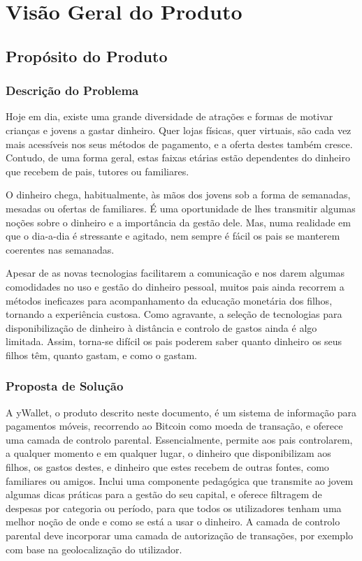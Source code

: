 \documentclass[12pt,a4paper]{article}
\begin{document}


\tableofcontents
\newpage
\section{Visão Geral do Produto}
  \subsection{Propósito do Produto}
    \subsubsection{Descrição do Problema}

      Hoje em dia, existe uma grande diversidade de atrações e formas de motivar crianças e jovens a gastar dinheiro. Quer lojas físicas, quer virtuais, são cada vez mais acessíveis nos seus métodos de pagamento, e a oferta destes também cresce. Contudo, de uma forma geral, estas faixas etárias estão dependentes do dinheiro que recebem de pais, tutores ou familiares.

      O dinheiro chega, habitualmente, às mãos dos jovens sob a forma de semanadas, mesadas ou ofertas de familiares. É uma oportunidade de lhes transmitir algumas noções sobre o dinheiro e a importância da gestão dele. Mas, numa realidade em que o dia-a-dia é stressante e agitado, nem sempre é fácil os pais se manterem coerentes nas semanadas.

      Apesar de as novas tecnologias facilitarem a comunicação e nos darem algumas comodidades no uso e gestão do dinheiro pessoal, muitos pais ainda recorrem a métodos ineficazes para acompanhamento da educação monetária dos filhos, tornando a experiência custosa. Como agravante, a seleção de tecnologias para disponibilização de dinheiro à distância e controlo de gastos ainda é algo limitada. Assim, torna-se difícil os pais poderem saber quanto dinheiro os seus filhos têm, quanto gastam, e como o gastam.

    \subsubsection{Proposta de Solução}

      A yWallet, o produto descrito neste documento, é um sistema de informação para pagamentos móveis, recorrendo ao Bitcoin como moeda de transação, e oferece uma camada de controlo parental. Essencialmente, permite aos pais controlarem, a qualquer momento e em qualquer lugar, o dinheiro que disponibilizam aos filhos, os gastos destes, e dinheiro que estes recebem de outras fontes, como familiares ou amigos. Inclui uma componente pedagógica que transmite ao jovem algumas dicas práticas para a gestão do seu capital, e oferece filtragem de despesas por categoria ou período, para que todos os utilizadores tenham uma melhor noção de onde e como se está a usar o dinheiro. A camada de controlo parental deve incorporar uma camada de autorização de transações, por exemplo com base na geolocalização do utilizador.
\end{document}
